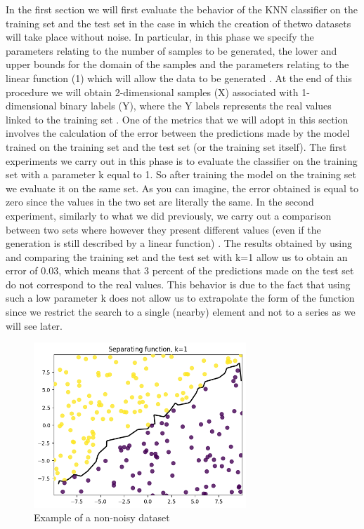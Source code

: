 \documentclass[a4paper,10pt,oneside]{article}
\begin{document}
In the first section we will first evaluate the behavior of the KNN classifier 
on the training set and the test set in the case in which the creation of thetwo datasets will 
take place without noise. 
In particular, in this phase we specify the parameters relating 
to the number of samples to be generated, the lower and upper bounds for 
the domain of the samples and the parameters relating to the linear function 
(1) which will allow the data to be generated . 
At the end of this procedure we will obtain 2-dimensional samples (X) associated 
with 1-dimensional binary labels (Y), where the Y labels represents the real 
values linked to the training set .
One of the metrics that we will adopt in this section involves the calculation 
of the error between the predictions made by the model trained on the training 
set and the test set (or the training set itself). 
The first experiments we carry out in this phase is to evaluate the classifier 
on the training set with a parameter k equal to 1. 
So after training the model on the training set we evaluate it on the same set.
As you can imagine, the error obtained is equal to zero since the values in the 
two set are literally the same.
In the second experiment, similarly to what we did previously, we carry out a 
comparison between two sets where however they present different values 
(even if the generation is still described by a linear function) . 
The results obtained by using and comparing the training set and the test 
set with k=1 allow us to obtain an error of 0.03, which means that 3 percent 
of the predictions made on the test set do not correspond to the real values.
This behavior is due to the fact that using such a low parameter k does not 
allow us to extrapolate the form of the function since we restrict the search to
a single (nearby) element and not to a series as we will see later.

\begin{figure}[h]
  \includegraphics[width=8cm]{first_experiment.png}
  \caption{Example of a non-noisy dataset}
\end{figure}
\end{document}
